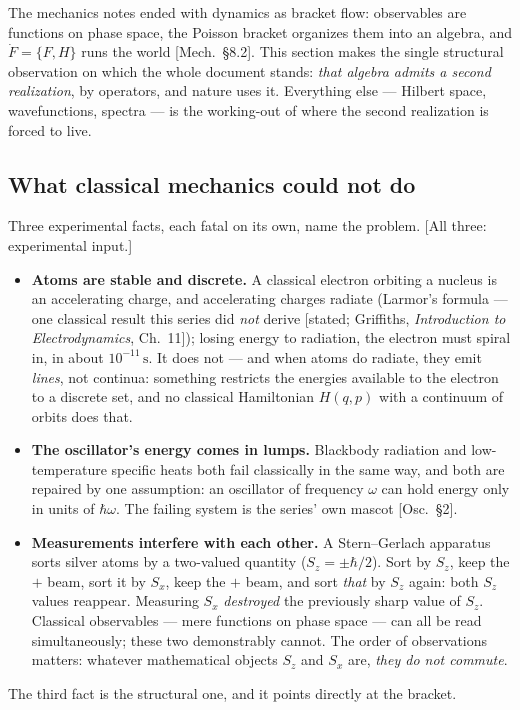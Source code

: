 \documentclass[11pt]{article}
\theoremstyle{plain}
\theoremstyle{definition}
\theoremstyle{remark}
\begin{document}
The mechanics notes ended with dynamics as bracket flow: observables
are functions on phase space, the Poisson bracket organizes them into
an algebra, and $\dot F = \{F, H\}$ runs the world [Mech.\ \S8.2]. This
section makes the single structural observation on which the whole
document stands: \emph{that algebra admits a second realization}, by
operators, and nature uses it. Everything else --- Hilbert space,
wavefunctions, spectra --- is the working-out of where the second
realization is forced to live.

\subsection{What classical mechanics could not do}
\label{sec:classical-failures}

Three experimental facts, each fatal on its own, name the problem.
[All three: experimental input.]
\begin{itemize}
  \item \textbf{Atoms are stable and discrete.} A classical electron
  orbiting a nucleus is an accelerating charge, and accelerating
  charges radiate (Larmor's formula --- one classical result this
  series did \emph{not} derive [stated; Griffiths, \emph{Introduction
  to Electrodynamics}, Ch.~11]); losing energy to radiation,
  the electron must spiral in, in about $10^{-11}\,\mathrm{s}$. It does not --- and when atoms do radiate,
  they emit \emph{lines}, not continua: something restricts the
  energies available to the electron to a discrete set, and no
  classical Hamiltonian $H(q,p)$ with a continuum of orbits does
  that.
  \item \textbf{The oscillator's energy comes in lumps.} Blackbody
  radiation and low-temperature specific heats both fail classically
  in the same way, and both are repaired by one assumption: an
  oscillator of frequency $\omega$ can hold energy only in units of
  $\hbar\omega$. The failing system is the series' own mascot
  [Osc.\ \S2].
  \item \textbf{Measurements interfere with each other.} A
  Stern--Gerlach apparatus sorts silver atoms by a two-valued
  quantity ($S_z = \pm\hbar/2$). Sort by $S_z$, keep the $+$ beam,
  sort it by $S_x$, keep the $+$ beam, and sort \emph{that} by $S_z$
  again: both $S_z$ values reappear. Measuring $S_x$ \emph{destroyed}
  the previously sharp value of $S_z$. Classical observables --- mere
  functions on phase space --- can all be read simultaneously; these
  two demonstrably cannot. The order of observations matters:
  whatever mathematical objects $S_z$ and $S_x$ are, \emph{they do
  not commute}.
\end{itemize}
The third fact is the structural one, and it points directly at the
bracket.
\end{document}
